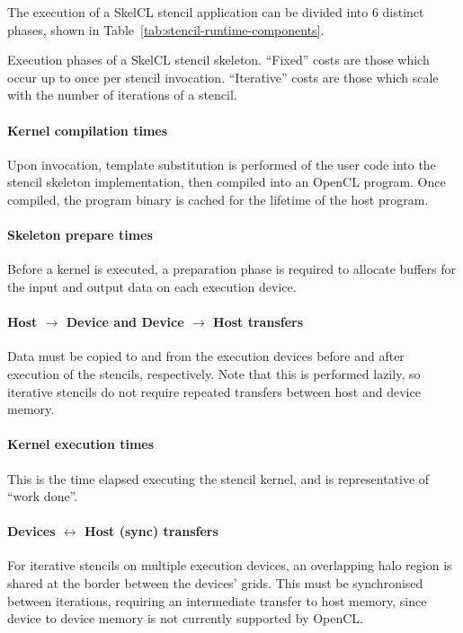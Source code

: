 The execution of a SkelCL stencil application can be divided into 6
distinct phases, shown in Table~\ref{tab:stencil-runtime-components}.


\begin{table}

\caption{Execution phases of a SkelCL stencil skeleton. ``Fixed''
  costs are those which occur up to once per stencil
  invocation. ``Iterative'' costs are those which scale with the
  number of iterations of a stencil.}
\label{tab:stencil-runtime-components}
\end{table}

\paragraph{Kernel compilation times} Upon invocation, template
substitution is performed of the user code into the stencil skeleton
implementation, then compiled into an OpenCL program. Once compiled,
the program binary is cached for the lifetime of the host program.

\paragraph{Skeleton prepare times} Before a kernel is executed, a
preparation phase is required to allocate buffers for the input and
output data on each execution device.

\paragraph{Host $\rightarrow$ Device and Device $\rightarrow$ Host
  transfers} Data must be copied to and from the execution devices
before and after execution of the stencils, respectively. Note that
this is performed lazily, so iterative stencils do not require
repeated transfers between host and device memory.

\paragraph{Kernel execution times} This is the time elapsed executing
the stencil kernel, and is representative of ``work done''.

\paragraph{Devices $\leftrightarrow$ Host (sync) transfers} For
iterative stencils on multiple execution devices, an overlapping halo
region is shared at the border between the devices' grids. This must
be synchronised between iterations, requiring an intermediate transfer
to host memory, since device to device memory is not currently
supported by OpenCL.


